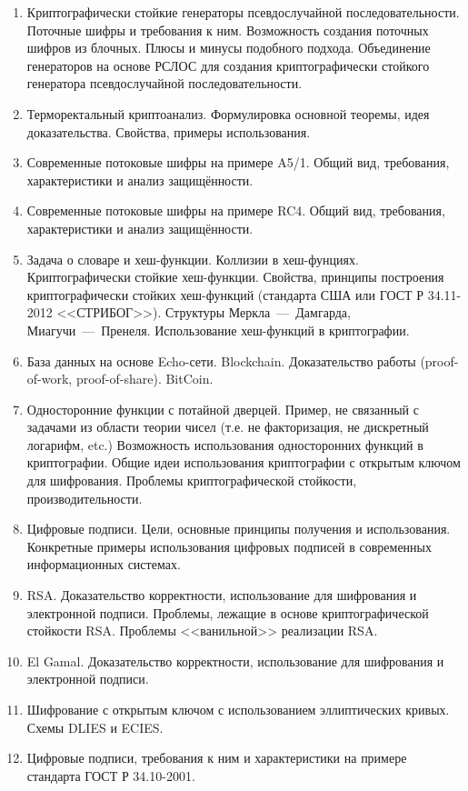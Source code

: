 \begin{enumerate}
    \item Криптографически стойкие генераторы псевдослучайной последовательности. Поточные шифры и требования к ним. Возможность создания поточных шифров из блочных. Плюсы и минусы подобного подхода. Объединение генераторов на основе РСЛОС для создания криптографически стойкого генератора псевдослучайной последовательности.
    \item Терморектальный криптоанализ. Формулировка основной теоремы, идея доказательства. Свойства, примеры использования.
    \item Современные потоковые шифры на примере A5/1. Общий вид, требования, характеристики и анализ защищённости.
    \item Современные потоковые шифры на примере RC4. Общий вид, требования, характеристики и анализ защищённости.
    \item Задача о словаре и хеш-функции. Коллизии в хеш-фунциях. Криптографически стойкие хеш-функции. Свойства, принципы построения криптографически стойких хеш-функций (стандарта США или ГОСТ Р 34.11-2012 <<СТРИБОГ>>). Структуры Меркла~---~Дамгарда, Миагучи~---~Пренеля. Использование хеш-функций в криптографии.
    \item База данных на основе Echo-сети. Blockchain. Доказательство работы (proof-of-work, proof-of-share). BitCoin.
    \item Односторонние функции с потайной дверцей. Пример, не связанный с задачами из области теории чисел (т.е. не факторизация, не дискретный логарифм, etc.) Возможность использования односторонних функций в криптографии. Общие идеи использования криптографии с открытым ключом для шифрования. Проблемы криптографической стойкости, производительности.
    \item Цифровые подписи. Цели, основные принципы получения и использования. Конкретные примеры использования цифровых подписей в современных информационных системах.
    \item RSA. Доказательство корректности, использование для шифрования и электронной подписи. Проблемы, лежащие в основе криптографической стойкости RSA. Проблемы <<ванильной>> реализации RSA.
    \item El Gamal. Доказательство корректности, использование для шифрования и электронной подписи.
    \item Шифрование с открытым ключом с использованием эллиптических кривых. Схемы DLIES и ECIES.
    \item Цифровые подписи, требования к ним и характеристики на примере стандарта ГОСТ Р 34.10-2001.

\end{enumerate}
